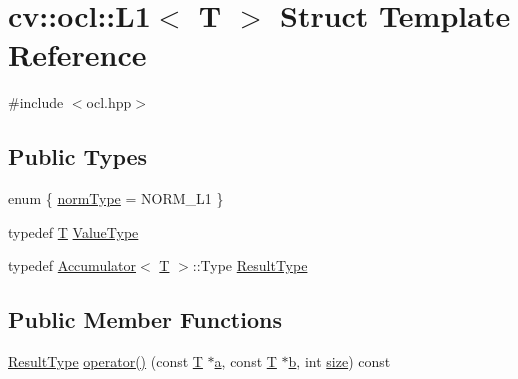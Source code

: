 \hypertarget{structcv_1_1ocl_1_1L1}{\section{cv\-:\-:ocl\-:\-:L1$<$ T $>$ Struct Template Reference}
\label{structcv_1_1ocl_1_1L1}
}


{\ttfamily \#include $<$ocl.\-hpp$>$}

\subsection*{Public Types}
\begin{DoxyCompactItemize}
\item 
enum \{ \hyperlink{structcv_1_1ocl_1_1L1_aba06491002e9cc3b0a573cf966cbb6bfa1284db4e2f8401747372b88d9f1b285c}{norm\-Type} = N\-O\-R\-M\-\_\-\-L1
 \}
\item 
typedef \hyperlink{calib3d_8hpp_a3efb9551a871ddd0463079a808916717}{T} \hyperlink{structcv_1_1ocl_1_1L1_a717e28847f2520db35b82753039cebc2}{Value\-Type}
\item 
typedef \hyperlink{structcv_1_1ocl_1_1Accumulator}{Accumulator}$<$ \hyperlink{calib3d_8hpp_a3efb9551a871ddd0463079a808916717}{T} $>$\-::Type \hyperlink{structcv_1_1ocl_1_1L1_abe051206cac634a5a6bd94feae851875}{Result\-Type}
\end{DoxyCompactItemize}
\subsection*{Public Member Functions}
\begin{DoxyCompactItemize}
\item 
\hyperlink{structcv_1_1ocl_1_1L1_abe051206cac634a5a6bd94feae851875}{Result\-Type} \hyperlink{structcv_1_1ocl_1_1L1_aa28b9f54b6ffce10aa9c2e3e75f5134c}{operator()} (const \hyperlink{calib3d_8hpp_a3efb9551a871ddd0463079a808916717}{T} $\ast$\hyperlink{legacy_8hpp_a1031d0e0a97a340abfe0a6ab9e831045}{a}, const \hyperlink{calib3d_8hpp_a3efb9551a871ddd0463079a808916717}{T} $\ast$\hyperlink{legacy_8hpp_ac04272e8ca865b8fba18d36edae9fd2a}{b}, int \hyperlink{legacy_8hpp_ae97003f8d5c64cdfb99f6f2606d121b6}{size}) const 
\end{DoxyCompactItemize}


